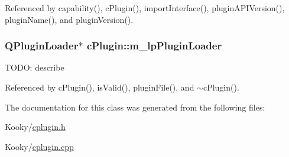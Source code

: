 Referenced by capability(), c\+Plugin(), import\+Interface(), plugin\+A\+P\+I\+Version(), plugin\+Name(), and plugin\+Version().

\subsubsection[{\texorpdfstring{m\+\_\+lp\+Plugin\+Loader}{m_lpPluginLoader}}]{\setlength{\rightskip}{0pt plus 5cm}Q\+Plugin\+Loader$\ast$ c\+Plugin\+::m\+\_\+lp\+Plugin\+Loader\hspace{0.3cm}{\ttfamily [private]}}\hypertarget{classc_plugin_a48d7a4870299a7fc61375eb84e791d04}{}\label{classc_plugin_a48d7a4870299a7fc61375eb84e791d04}
T\+O\+DO\+: describe 

Referenced by c\+Plugin(), is\+Valid(), plugin\+File(), and $\sim$c\+Plugin().



The documentation for this class was generated from the following files\+:\begin{DoxyCompactItemize}
\item 
Kooky/\hyperlink{cplugin_8h}{cplugin.\+h}\item 
Kooky/\hyperlink{cplugin_8cpp}{cplugin.\+cpp}\end{DoxyCompactItemize}
